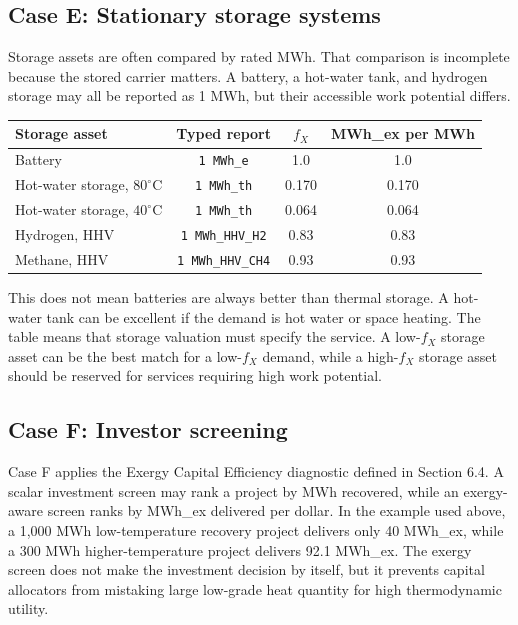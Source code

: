 \documentclass[11pt]{article}
\newcommand{\fx}{f_X}
\newcommand{\degC}{^{\circ}\mathrm{C}}
\begin{document}
\subsection*{Case E: Stationary storage systems}

Storage assets are often compared by rated MWh. That comparison is incomplete because the stored carrier matters. A battery, a hot-water tank, and hydrogen storage may all be reported as 1 MWh, but their accessible work potential differs.

\begin{center}
\begin{tabular}{@{}lccc@{}}
\toprule
Storage asset & Typed report & $\fx$ & MWh\_ex per MWh \\
\midrule
Battery & \texttt{1 MWh\_e} & 1.0 & 1.0 \\
Hot-water storage, $80\degC$ & \texttt{1 MWh\_th} & 0.170 & 0.170 \\
Hot-water storage, $40\degC$ & \texttt{1 MWh\_th} & 0.064 & 0.064 \\
Hydrogen, HHV & \texttt{1 MWh\_HHV\_H2} & 0.83 & 0.83 \\
Methane, HHV & \texttt{1 MWh\_HHV\_CH4} & 0.93 & 0.93 \\
\bottomrule
\end{tabular}
\end{center}
This does not mean batteries are always better than thermal storage. A hot-water tank can be excellent if the demand is hot water or space heating. The table means that storage valuation must specify the service. A low-$\fx$ storage asset can be the best match for a low-$\fx$ demand, while a high-$\fx$ storage asset should be reserved for services requiring high work potential.

\subsection*{Case F: Investor screening}

Case F applies the Exergy Capital Efficiency diagnostic defined in Section 6.4. A scalar investment screen may rank a project by MWh recovered, while an exergy-aware screen ranks by MWh\_ex delivered per dollar. In the example used above, a 1,000 MWh low-temperature recovery project delivers only 40 MWh\_ex, while a 300 MWh higher-temperature project delivers 92.1 MWh\_ex. The exergy screen does not make the investment decision by itself, but it prevents capital allocators from mistaking large low-grade heat quantity for high thermodynamic utility.
\end{document}
